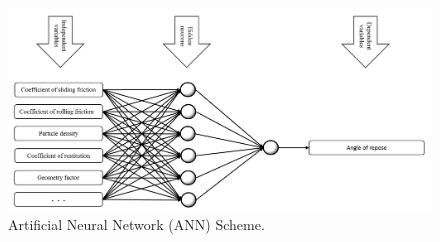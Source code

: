 \begin{figure}[!htb]
\centering
\includegraphics[width=.80\columnwidth]{images/018nnscheme}
\caption[ANN Scheme]{Artificial Neural Network (\acs{ANN}) Scheme.}
\label{fig:018nnscheme}
\end{figure}
